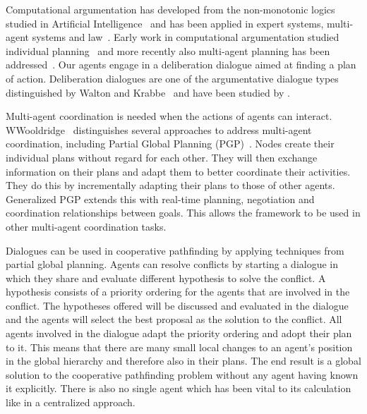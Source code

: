 Computational argumentation has developed from the non-monotonic logics studied 
in Artificial Intelligence~\cite{dung1995} and has been applied in expert 
systems, multi-agent systems and law~\cite{vaneemeren2014}. Early work in 
computational argumentation studied individual planning~\cite{pollock1995} and 
more recently also multi-agent planning has been 
addressed~\cite{ferrando2012,pardo2011}. Our agents engage in a deliberation 
dialogue aimed at finding a plan of action. Deliberation dialogues are one of 
the argumentative dialogue types distinguished by Walton and 
Krabbe~ and have been studied by 
\cite{mcburney2007,walton2014,dunin-keplicz2011}.

Multi-agent coordination is needed when the actions of agents can interact. 
WWooldridge~ distinguishes several 
approaches to address multi-agent coordination, including Partial Global 
Planning (PGP)~\cite{durfee1991}. Nodes create their individual plans without 
regard for each other. They will then exchange information on their plans and
adapt them to better coordinate their activities. They do this by incrementally 
adapting their plans to those of other agents.
Generalized PGP \cite{decker1992} extends this with real-time planning, 
negotiation and coordination relationships between goals. This allows the 
framework to be used in other multi-agent coordination tasks.

Dialogues can be used in cooperative pathfinding by applying techniques from
partial global planning. Agents can resolve conflicts by starting a dialogue in
which they share and evaluate different hypothesis to solve the conflict. A
hypothesis consists of a priority ordering for the agents that are involved in
the conflict. The hypotheses offered will be discussed and evaluated in the
dialogue and the agents will select the best proposal as the solution
to the conflict. All agents involved in the dialogue adapt the priority
ordering and adopt their plan to it. This means that there are many small local
changes to an agent's position in the global hierarchy and therefore also in
their plans. The end result is a global solution to the cooperative pathfinding
problem without any agent having known it explicitly. There is also no single
agent which has been vital to its calculation like in a centralized approach.
